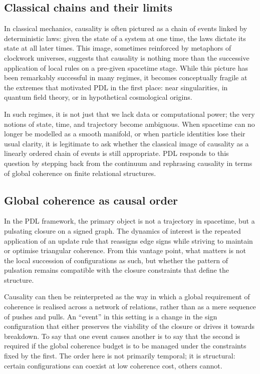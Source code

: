 \documentclass[11pt,a4paper]{article}
\theoremstyle{definition}
\begin{document}
\subsection{Classical chains and their limits}

In classical mechanics, causality is often pictured as a chain of events linked by deterministic laws: given the state of a system at one time, the laws dictate its state at all later times. This image, sometimes reinforced by metaphors of clockwork universes, suggests that causality is nothing more than the successive application of local rules on a pre-given spacetime stage. While this picture has been remarkably successful in many regimes, it becomes conceptually fragile at the extremes that motivated PDL in the first place: near singularities, in quantum field theory, or in hypothetical cosmological origins.\cite{Laubscher_EmergencePhysicalReality_2024,Laubscher_PDL_Position_2024}

In such regimes, it is not just that we lack data or computational power; the very notions of state, time, and trajectory become ambiguous. When spacetime can no longer be modelled as a smooth manifold, or when particle identities lose their usual clarity, it is legitimate to ask whether the classical image of causality as a linearly ordered chain of events is still appropriate.\cite{Laubscher_Existence_PulsatingClosure_2026} PDL responds to this question by stepping back from the continuum and rephrasing causality in terms of global coherence on finite relational structures.

\subsection{Global coherence as causal order}

In the PDL framework, the primary object is not a trajectory in spacetime, but a pulsating closure on a signed graph.\cite{Laubscher_IntroPDL_2024,Laubscher_EmergencePhysicalReality_2024} The dynamics of interest is the repeated application of an update rule that reassigns edge signs while striving to maintain or optimise triangular coherence. From this vantage point, what matters is not the local succession of configurations as such, but whether the pattern of pulsation remains compatible with the closure constraints that define the structure.

Causality can then be reinterpreted as the way in which a global requirement of coherence is realised across a network of relations, rather than as a mere sequence of pushes and pulls. An ``event'' in this setting is a change in the sign configuration that either preserves the viability of the closure or drives it towards breakdown.\cite{Laubscher_Leakage_Probability_2024,Laubscher_EffectiveFields_2024} To say that one event causes another is to say that the second is required if the global coherence budget is to be managed under the constraints fixed by the first. The order here is not primarily temporal; it is structural: certain configurations can coexist at low coherence cost, others cannot.\cite{Laubscher_Existence_PulsatingClosure_2026}
\end{document}
